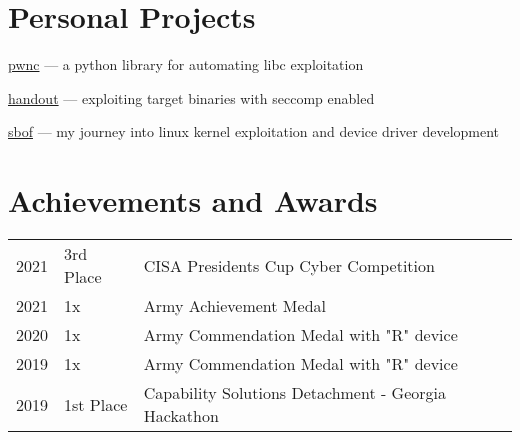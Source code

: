 \documentclass[]{resume}
\begin{document}
\begin{minipage}[t]{0.69\textwidth}
\section{Personal Projects}
\begin{tightemize}
\item \href{https://github.com/jhilbs3/pwnc}{pwnc} --- a python library for automating libc exploitation
\item \href{https://github.com/jhilbs3/portfpolio/chals/handout}{handout} --- exploiting target binaries with seccomp enabled
\item \href{https://github.com/jhilbs3/portfpolio/sbof/}{sbof} --- my journey into linux kernel exploitation and device driver development
\end{tightemize}

\section{Achievements and Awards}
\begin{tabular}{rll}
2021         & 3rd Place  & CISA Presidents Cup Cyber Competition \\
2021         & 1x         & Army Achievement Medal \\
2020		 & 1x         & Army Commendation Medal with "R" device \\
2019         & 1x         & Army Commendation Medal with "R" device \\
2019         & 1st Place  & Capability Solutions Detachment - Georgia Hackathon
\end{tabular}


\end{minipage}

%
%

\end{document}

